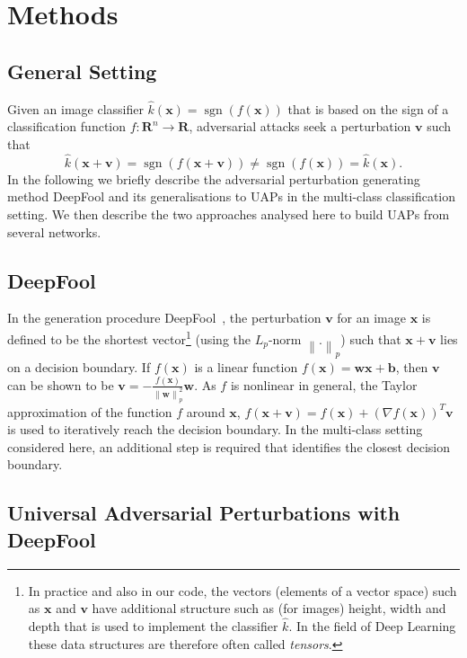 \documentclass[runningheads]{llncs}
\DeclareMathOperator{\sgn}{sgn}
\newcommand{\xb}{\ensuremath{\mathbf{x}}}
\newcommand{\vb}{\ensuremath{\mathbf{v}}}
\begin{document}
\section{Methods}\label{sec:methods}
\subsection{General Setting}
Given an image classifier \(\hat{k}(\xb)=\sgn\left(f(\xb)\right)\) that is based on the sign of a classification function \(f:\mathbf{R}^n\rightarrow\mathbf{R}\), adversarial attacks seek a perturbation \(\vb\) such that \[\hat{k}(\xb+\vb)=\sgn\left(f(\xb+\vb)\right)\neq \sgn\left(f(\xb)\right)=\hat{k}(\xb).\] 
In the following we briefly describe the adversarial perturbation generating method DeepFool and its generalisations to UAPs in the multi-class classification setting. We then describe the two approaches analysed here to build UAPs from several networks.

\subsection{DeepFool}\label{sec:DeepFool}

In the generation procedure DeepFool~\cite{moosavi-dezfooli_deepfool_2016}, the perturbation \(\mathbf{v}\) for an image \(\xb\) is defined to be the shortest vector\footnote{In practice and also in our code, the vectors (elements of a vector space) such as \(\xb\) and \(\vb\) have additional structure such as (for images) height, width and depth that is used to implement the classifier \(\hat{k}\). In the field of Deep Learning these data structures are therefore often called \emph{tensors}.}
(using the \(L_p\)-norm \(\left\|.\right\|_p\)) such that \(\xb+\mathbf{v}\) lies on a decision boundary. 
If $f(\xb)$ is a linear function $f(\xb)=\mathbf{w} \xb+\mathbf{b}$, then \(\mathbf{v}\) can be shown to be \(\mathbf{v}=-\frac{f(\xb)}{\left\|\mathbf{w}\right\|_p^2}\mathbf{w}\). As \(f\) is nonlinear in general, the Taylor approximation of the function $f$ around \(\mathbf{x}\), \(f(\mathbf{x}+\mathbf{v})=f(\mathbf{x})+\left(\nabla f(\mathbf{x})\right)^T\mathbf{v}\) is used to iteratively reach the decision boundary. 
In the multi-class setting considered here, an additional step is required that identifies the closest decision boundary. 

\subsection{Universal Adversarial Perturbations with DeepFool}
\end{document}
